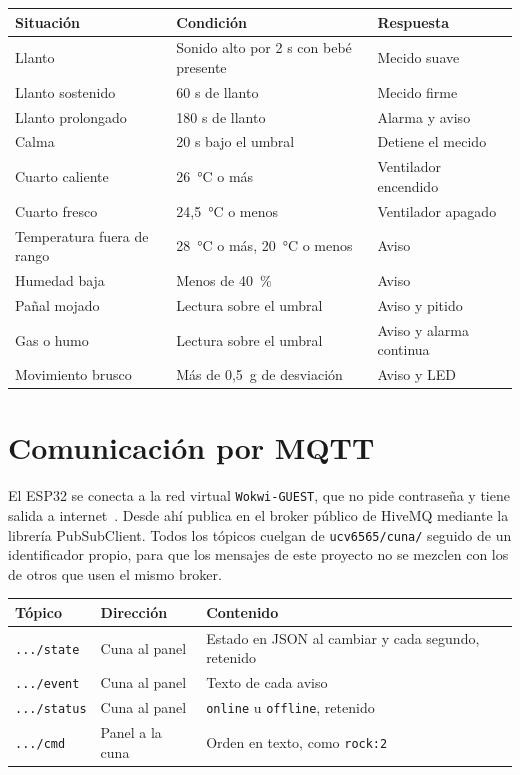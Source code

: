 \begin{center}
\small
\begin{tabular}{lll}
\hline
\textbf{Situación} & \textbf{Condición} & \textbf{Respuesta} \\
\hline
Llanto                 & Sonido alto por 2 s con bebé presente & Mecido suave \\
Llanto sostenido       & 60 s de llanto                        & Mecido firme \\
Llanto prolongado      & 180 s de llanto                       & Alarma y aviso \\
Calma                  & 20 s bajo el umbral                   & Detiene el mecido \\
Cuarto caliente        & 26~°C o más                           & Ventilador encendido \\
Cuarto fresco          & 24,5~°C o menos                       & Ventilador apagado \\
Temperatura fuera de rango & 28~°C o más, 20~°C o menos         & Aviso \\
Humedad baja           & Menos de 40~\%                        & Aviso \\
Pañal mojado           & Lectura sobre el umbral               & Aviso y pitido \\
Gas o humo             & Lectura sobre el umbral               & Aviso y alarma continua \\
Movimiento brusco      & Más de 0,5~g de desviación            & Aviso y LED \\
\hline
\end{tabular}
\end{center}

\section{Comunicación por MQTT}

El ESP32 se conecta a la red virtual \texttt{Wokwi-GUEST}, que no pide contraseña y
tiene salida a internet~\cite{wokwiwifi}. Desde ahí publica en el broker público de
HiveMQ mediante la librería PubSubClient. Todos los tópicos cuelgan de
\texttt{ucv6565/cuna/} seguido de un identificador propio, para que los mensajes de
este proyecto no se mezclen con los de otros que usen el mismo broker.

\begin{center}
\small
\begin{tabular}{lll}
\hline
\textbf{Tópico} & \textbf{Dirección} & \textbf{Contenido} \\
\hline
\texttt{.../state}   & Cuna al panel & Estado en JSON al cambiar y cada segundo, retenido \\
\texttt{.../event}   & Cuna al panel & Texto de cada aviso \\
\texttt{.../status}  & Cuna al panel & \texttt{online} u \texttt{offline}, retenido \\
\texttt{.../cmd}     & Panel a la cuna & Orden en texto, como \texttt{rock:2} \\
\hline
\end{tabular}
\end{center}

